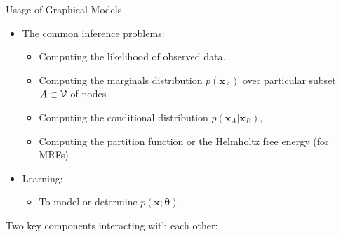 \begin{frame}{Usage of Graphical Models}
  \begin{itemize}[label={$\bullet$}]
  \item The common inference problems:
    \begin{itemize}[label={$\bullet$}]
    \item Computing the likelihood of observed data.
    \item Computing the marginals distribution $p(\bm{x}_A)$ over particular subset $A \subset \mathcal{V}$ of nodes
    \item Computing the conditional distribution $p(\bm{x}_A | \bm{x}_{B})$, 
    \item Computing the partition function or the Helmholtz free energy (for MRFs)
    \end{itemize}
  \item Learning:
    \begin{itemize}[label=$\bullet$]
      \item To model or determine $p(\bm{x}; \bm{\theta})$.
      \end{itemize}
  \end{itemize}
  

  
    Two key components interacting with each other:
    \begin{figure}[!t]
      \centering

    \end{figure}
  

\end{frame}











